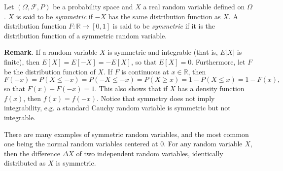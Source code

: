 \documentclass[12pt]{article}
\begin{document}

Let $(\Omega,\mathcal{F},P)$ be a probability space and $X$ a real random variable defined on $\Omega$.  $X$ is said to be \emph{symmetric} if $-X$ has the same distribution function as $X$.  A distribution function $F:\mathbb{R}\to [0,1]$ is said to be \emph{symmetric} if it is the distribution function of a symmetric random variable.

\textbf{Remark}.  If a random variable $X$ is symmetric and integrable (that is, $E|X|$ is finite), then $E[X]=E[-X]=-E[X]$, so that $E[X]=0$.  Furthermore, let $F$ be the distribution function of $X$.  If $F$ is continuous at $x\in\mathbb{R}$, then $$F(-x)=P(X\le -x)=P(-X\le -x)=P(X\ge x)=1-P(X\le x)=1-F(x),$$ so that $F(x)+F(-x)=1$.  This also shows that if $X$ has a density function $f(x)$, then $f(x)=f(-x)$. Notice that symmetry does not imply integrability, e.g. a standard Cauchy random variable is symmetric but not integrable.

There are many examples of symmetric random variables, and the most common one being the normal random variables centered at $0$.  For any random variable $X$, then the difference $\Delta X$ of two independent random variables, identically distributed as $X$ is symmetric.
\end{document}
